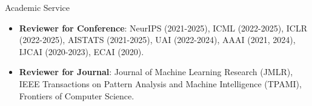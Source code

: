 \documentclass{resume} %
\begin{document}
\begin{rSection}{Academic Service}
\begin{itemize}[leftmargin=*]
\item \textbf{Reviewer for Conference}: NeurIPS (2021-2025), ICML (2022-2025), ICLR (2022-2025), AISTATS (2021-2025), UAI (2022-2024), AAAI (2021, 2024), IJCAI (2020-2023), ECAI (2020).
\item \textbf{Reviewer for Journal}: Journal of Machine Learning Research (JMLR), IEEE Transactions on Pattern Analysis and Machine Intelligence (TPAMI), Frontiers of Computer Science.
\end{itemize}

\end{rSection}
\end{document}
